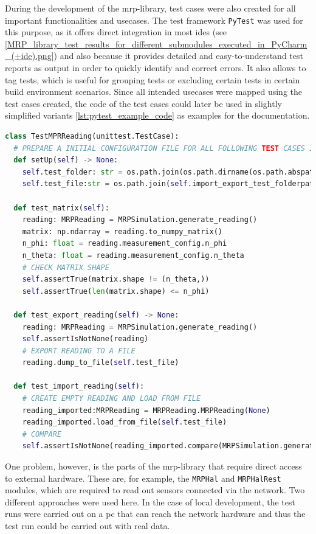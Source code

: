 During the development of the \gls{mrp}-library, test cases were also
created for all important functionalities and usecases. The test
framework \passthrough{\lstinline!PyTest!}\cite{PyTest} was used for
this purpose, as it offers direct integration in most \gls{ide}s (see
\ref{MRP_library_test_results_for_different_submodules_executed_in_PyCharm_(+ide).png})
and also because it provides detailed and easy-to-understand test
reports as output in order to quickly identify and correct errors. It
also allows to tag tests, which is useful for grouping tests or
excluding certain tests in certain build environment scenarios. Since
all intended usecases were mapped using the test cases created, the code
of the test cases could later be used in slightly simplified variants
\ref{lst:pytest_example_code} as examples for the documentation.

\begin{lstlisting}[language=Python, caption={Example pytest class for testing MRPReading module functions}, label=lst:pytest_example_code]
class TestMPRReading(unittest.TestCase):
  # PREPARE A INITIAL CONFIGURATION FILE FOR ALL FOLLOWING TEST CASES IN THIS FILE
  def setUp(self) -> None:
    self.test_folder: str = os.path.join(os.path.dirname(os.path.abspath(__file__)), "tmp")
    self.test_file:str = os.path.join(self.import_export_test_folderpath, "tmp")

  def test_matrix(self):
    reading: MRPReading = MRPSimulation.generate_reading()
    matrix: np.ndarray = reading.to_numpy_matrix()
    n_phi: float = reading.measurement_config.n_phi
    n_theta: float = reading.measurement_config.n_theta
    # CHECK MATRIX SHAPE
    self.assertTrue(matrix.shape != (n_theta,))
    self.assertTrue(len(matrix.shape) <= n_phi)

  def test_export_reading(self) -> None:
    reading: MRPReading = MRPSimulation.generate_reading()
    self.assertIsNotNone(reading)
    # EXPORT READING TO A FILE
    reading.dump_to_file(self.test_file)

  def test_import_reading(self):
    # CREATE EMPTY READING AND LOAD FROM FILE
    reading_imported:MRPReading = MRPReading.MRPReading(None)
    reading_imported.load_from_file(self.test_file)
    # COMPARE
    self.assertIsNotNone(reading_imported.compare(MRPSimulation.generate_reading()))
\end{lstlisting}

One problem, however, is the parts of the \gls{mrp}-library that require
direct access to external hardware. These are, for example, the
\passthrough{\lstinline!MRPHal!} and
\passthrough{\lstinline!MRPHalRest!} modules, which are required to read
out sensors connected via the network. Two different approaches were
used here. In the case of local development, the test runs were carried
out on a \gls{pc} that can reach the network hardware and thus the test
run could be carried out with real data.

